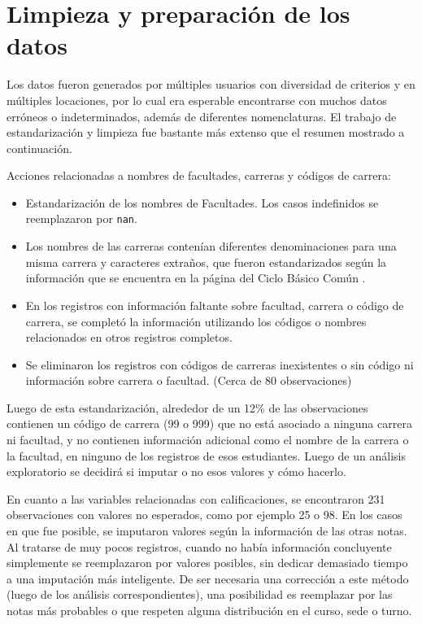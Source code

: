 \documentclass[a4paper,11pt,dvipsnames]{article}
\begin{document}
\section{Limpieza y preparación de los datos}

Los datos fueron generados por múltiples usuarios con diversidad de criterios y en múltiples locaciones, por lo cual era esperable encontrarse con muchos datos erróneos o indeterminados, además de diferentes nomenclaturas. El trabajo de estandarización y limpieza fue bastante más extenso que el resumen mostrado a continuación.\par\medskip

Acciones relacionadas a nombres de facultades, carreras y códigos de carrera:
\begin{itemize}
    \item Estandarización de los nombres de Facultades. Los casos indefinidos se reemplazaron por \texttt{nan}.
    \item Los nombres de las carreras contenían diferentes denominaciones para una misma carrera y caracteres extraños, que fueron estandarizados según la información que se encuentra en la página del Ciclo Básico Común \cite{cbc:carreras}.
    \item En los registros con información faltante sobre facultad, carrera o código de carrera, se completó la información utilizando los códigos o nombres relacionados en otros registros completos.
    \item Se eliminaron los registros con códigos de carreras inexistentes o sin código ni información sobre carrera o facultad. (Cerca de 80 observaciones)
\end{itemize}

Luego de esta estandarización, alrededor de un 12\% de las observaciones contienen un código de carrera (99 o 999) que no está asociado a ninguna carrera ni facultad, y no contienen información adicional como el nombre de la carrera o la facultad, en ninguno de los registros de esos estudiantes. Luego de un análisis exploratorio se decidirá si imputar o no esos valores y cómo hacerlo.\par\medskip

En cuanto a las variables relacionadas con calificaciones, se encontraron 231 observaciones con valores no esperados, como por ejemplo 25 o 98. En los casos en que fue posible, se imputaron valores según la información de las otras notas. Al tratarse de muy pocos registros, cuando no había información concluyente simplemente se reemplazaron por valores posibles, sin dedicar demasiado tiempo a una imputación más inteligente. De ser necesaria una corrección a este método (luego de los análisis correspondientes), una posibilidad es reemplazar por las notas más probables o que respeten alguna distribución en el curso, sede o turno.\par\medskip
\end{document}
